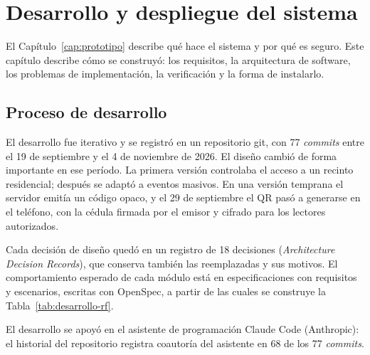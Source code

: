 \chapter{Desarrollo y despliegue del sistema}
\label{cap:desarrollo}

El Capítulo~\ref{cap:prototipo} describe qué hace el sistema y por qué es seguro. Este capítulo describe
cómo se construyó: los requisitos, la arquitectura de software, los problemas de implementación, la
verificación y la forma de instalarlo.

\section{Proceso de desarrollo}
\label{sec:desarrollo-proceso}

El desarrollo fue iterativo y se registró en un repositorio git, con 77 \textit{commits} entre el 19 de
septiembre y el 4 de noviembre de 2026. El diseño cambió de forma importante en ese período. La primera versión
controlaba el acceso a un recinto residencial; después se adaptó a eventos masivos. En una versión temprana el
servidor emitía un código opaco, y el 29 de septiembre el QR pasó a generarse en el teléfono, con la cédula
firmada por el emisor y cifrado para los lectores autorizados.

Cada decisión de diseño quedó en un registro de 18 decisiones (\textit{Architecture Decision Records}), que
conserva también las reemplazadas y sus motivos. El comportamiento esperado de cada módulo está en
especificaciones con requisitos y escenarios, escritas con OpenSpec, a partir de las cuales se construye la
Tabla~\ref{tab:desarrollo-rf}.

El desarrollo se apoyó en el asistente de programación Claude Code (Anthropic): el historial del repositorio
registra coautoría del asistente en 68 de los 77 \textit{commits}.

